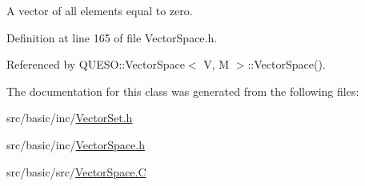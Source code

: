 A vector of all elements equal to zero. 



Definition at line 165 of file Vector\-Space.\-h.



Referenced by Q\-U\-E\-S\-O\-::\-Vector\-Space$<$ V, M $>$\-::\-Vector\-Space().



The documentation for this class was generated from the following files\-:\begin{DoxyCompactItemize}
\item 
src/basic/inc/\hyperlink{_vector_set_8h}{Vector\-Set.\-h}\item 
src/basic/inc/\hyperlink{_vector_space_8h}{Vector\-Space.\-h}\item 
src/basic/src/\hyperlink{_vector_space_8_c}{Vector\-Space.\-C}\end{DoxyCompactItemize}
